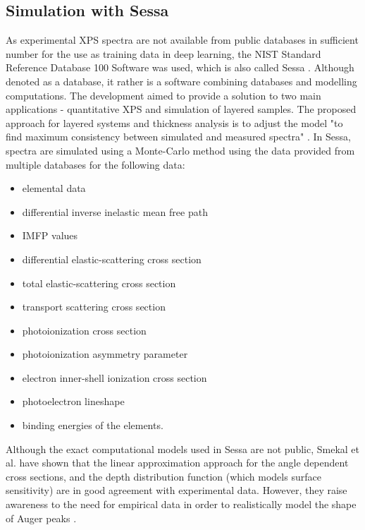 \subsection{Simulation with Sessa}
\label{subchap:sim_sessa}
As experimental XPS spectra are not available from public databases in sufficient number for the use as training data in deep learning, the NIST Standard Reference Database 100 Software was used, which is also called Sessa \cite{noauthor_nist_2010, smekal_simulation_2005}. Although denoted as a database, it rather is a software combining databases and modelling computations. The development aimed to provide a solution to two main applications - quantitative XPS and simulation of layered samples. The proposed approach for layered systems and thickness analysis is to adjust the model "to find maximum consistency between simulated and measured spectra" \cite{smekal_simulation_2005}.
In Sessa, spectra are simulated using a Monte-Carlo method using the data provided from multiple databases for the following data:

\begin{itemize}
    \item elemental data
    \item differential inverse inelastic mean free path
    \item IMFP values
    \item differential elastic-scattering cross section
    \item total elastic-scattering cross section
    \item transport scattering cross section
    \item photoionization cross section
    \item photoionization asymmetry parameter
    \item electron inner-shell ionization cross section
    \item photoelectron lineshape
    \item binding energies of the elements.
\end{itemize}

Although the exact computational models used in Sessa are not public, Smekal et al. have shown that the linear approximation approach for the angle dependent cross sections, and the depth distribution function (which models surface sensitivity) are in good agreement with experimental data. However, they raise awareness to the need for empirical data in order to realistically model the shape of Auger peaks \cite{smekal_simulation_2005}. 

